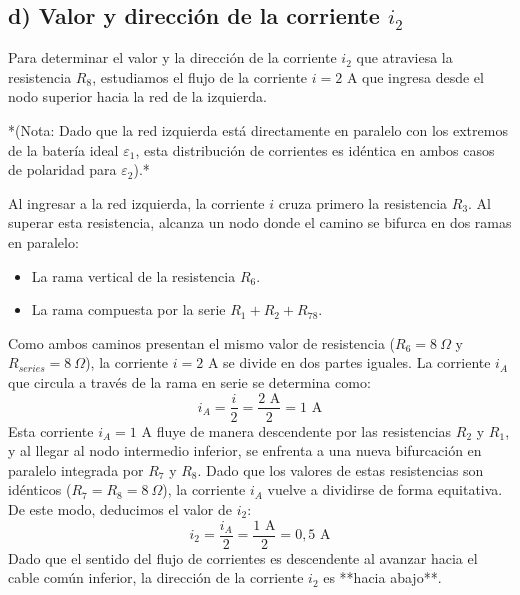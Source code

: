 \documentclass{article}
\begin{document}
\subsection*{d) Valor y dirección de la corriente $i_2$}

Para determinar el valor y la dirección de la corriente $i_2$ que atraviesa la resistencia $R_8$, estudiamos el flujo de la corriente $i = 2\text{ A}$ que ingresa desde el nodo superior hacia la red de la izquierda. 

*(Nota: Dado que la red izquierda está directamente en paralelo con los extremos de la batería ideal $\varepsilon_1$, esta distribución de corrientes es idéntica en ambos casos de polaridad para $\varepsilon_2$).*

Al ingresar a la red izquierda, la corriente $i$ cruza primero la resistencia $R_3$. Al superar esta resistencia, alcanza un nodo donde el camino se bifurca en dos ramas en paralelo:
\begin{itemize}
    \item La rama vertical de la resistencia $R_6$.
    \item La rama compuesta por la serie $R_1 + R_2 + R_{78}$.
\end{itemize}
Como ambos caminos presentan el mismo valor de resistencia ($R_6 = 8\ \Omega$ y $R_{series} = 8\ \Omega$), la corriente $i = 2\text{ A}$ se divide en dos partes iguales. La corriente $i_A$ que circula a través de la rama en serie se determina como:
\[
i_A = \frac{i}{2} = \frac{2\text{ A}}{2} = 1\text{ A}
\]
Esta corriente $i_A = 1\text{ A}$ fluye de manera descendente por las resistencias $R_2$ y $R_1$, y al llegar al nodo intermedio inferior, se enfrenta a una nueva bifurcación en paralelo integrada por $R_7$ y $R_8$. Dado que los valores de estas resistencias son idénticos ($R_7 = R_8 = 8\ \Omega$), la corriente $i_A$ vuelve a dividirse de forma equitativa. De este modo, deducimos el valor de $i_2$:
\[
i_2 = \frac{i_A}{2} = \frac{1\text{ A}}{2} = \boxed{0{,}5\text{ A}}
\]
Dado que el sentido del flujo de corrientes es descendente al avanzar hacia el cable común inferior, la dirección de la corriente $i_2$ es **hacia abajo**.

\noindent{}
\end{document}
